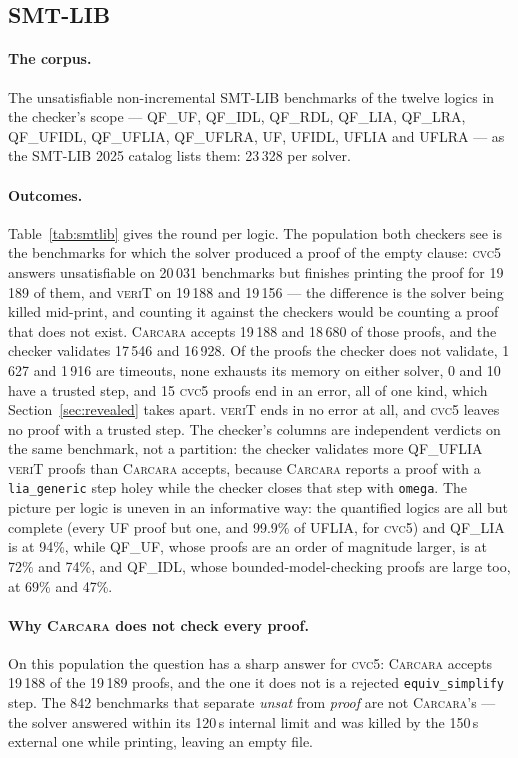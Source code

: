 \documentclass[runningheads]{llncs}
\newcommand{\cvcv}{\textsc{cvc5}\xspace}
\newcommand{\carcara}{\textsc{Carcara}\xspace}
\newcommand{\verit}{\textsc{veriT}\xspace}
\newcommand{\rulename}[1]{\texttt{#1}}
\begin{document}
\subsection{SMT-LIB}
\label{sec:smtlib}

\paragraph{The corpus.} The unsatisfiable non-incremental SMT-LIB benchmarks
of the twelve logics in the checker's scope --- QF\_UF, QF\_IDL, QF\_RDL,
QF\_LIA, QF\_LRA, QF\_UFIDL, QF\_UFLIA, QF\_UFLRA, UF, UFIDL, UFLIA and UFLRA
--- as the SMT-LIB 2025 catalog lists them: 23\,328 per solver.

\paragraph{Outcomes.} Table~\ref{tab:smtlib} gives the round per logic. The
population both checkers see is the benchmarks for which the solver produced a
proof of the empty clause: \cvcv answers unsatisfiable on 20\,031 benchmarks
but finishes printing the proof for 19\,189 of them, and \verit on 19\,188 and
19\,156 --- the difference is the solver being killed mid-print, and counting
it against the checkers would be counting a proof that does not exist.
\carcara accepts 19\,188 and 18\,680 of those proofs, and the checker
validates 17\,546 and 16\,928. Of the proofs the checker does not validate,
1\,627 and 1\,916 are timeouts, none exhausts its memory on either solver, 0
and 10 have a trusted step, and 15 \cvcv proofs end in an error, all of one
kind, which Section~\ref{sec:revealed} takes apart. \verit ends in no error at
all, and \cvcv leaves no proof with a trusted step. The checker's columns are independent verdicts on the same
benchmark, not a partition: the checker validates more QF\_UFLIA \verit proofs
than \carcara accepts, because \carcara reports a proof with a
\rulename{lia\_generic} step holey while the checker closes that step with
\texttt{omega}. The picture per logic is uneven in an informative way: the
quantified logics are all but complete (every UF proof but one, and 99.9\% of
UFLIA, for \cvcv) and QF\_LIA is at 94\%, while QF\_UF, whose proofs are an
order of magnitude larger, is at 72\% and 74\%, and QF\_IDL, whose
bounded-model-checking proofs are large too, at 69\% and 47\%.

\paragraph{Why \carcara does not check every proof.} On this population the
question has a sharp answer for \cvcv: \carcara accepts 19\,188 of the 19\,189
proofs, and the one it does not is a rejected \rulename{equiv\_simplify} step.
The 842 benchmarks that separate \emph{unsat} from \emph{proof} are not
\carcara's --- the solver answered within its 120\,s internal limit and was
killed by the 150\,s external one while printing, leaving an empty file.
\end{document}
